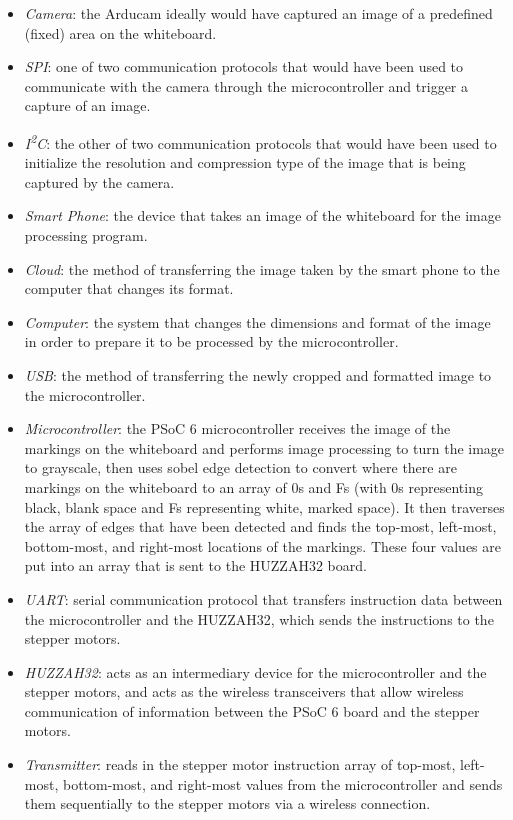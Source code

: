 \begin{itemize}
	\item \textit{Camera}: the Arducam ideally would have captured an image of a predefined (fixed) area on the whiteboard.
	\item \textit{SPI}: one of two communication protocols that would have been used to communicate with the camera through the microcontroller and trigger a capture of an image.
	\item \textit{I\textsuperscript{2}C}: the other of two communication protocols that would have been used to initialize the resolution and compression type of the image that is being captured by the camera.
	\item \textit{Smart Phone}: the device that takes an image of the whiteboard for the image processing program.
	\item \textit{Cloud}: the method of transferring the image taken by the smart phone to the computer that changes its format.
	\item \textit{Computer}: the system that changes the dimensions and format of the image in order to prepare it to be processed by the microcontroller.
	\item \textit{USB}: the method of transferring the newly cropped and formatted image to the microcontroller.
	\item \textit{Microcontroller}: the PSoC 6 microcontroller receives the image of the markings on the whiteboard and performs image processing to turn the image to grayscale, then uses sobel edge detection to convert where there are markings on the whiteboard to an array of 0s and Fs (with 0s representing black, blank space and Fs representing white, marked space). It then traverses the array of edges that have been detected and finds the top-most, left-most, bottom-most, and right-most locations of the markings. These four values are put into an array that is sent to the HUZZAH32 board.
	\item \textit{UART}: serial communication protocol that transfers instruction data between the microcontroller and the HUZZAH32, which sends the instructions to the stepper motors.
	\item \textit{HUZZAH32}: acts as an intermediary device for the microcontroller and the stepper motors, and acts as the wireless transceivers that allow wireless communication of information between the PSoC 6 board and the stepper motors.
	\item \textit{Transmitter}: reads in the stepper motor instruction array of top-most, left-most, bottom-most, and right-most values from the microcontroller and sends them sequentially to the stepper motors via a wireless connection.

\end{itemize}
